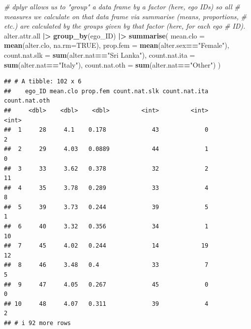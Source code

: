 \documentclass[
]{book}
\newenvironment{Shaded}{\begin{snugshade}}{\end{snugshade}}
\newcommand{\AttributeTok}[1]{\textcolor[rgb]{0.13,0.29,0.53}{#1}}
\newcommand{\CommentTok}[1]{\textcolor[rgb]{0.56,0.35,0.01}{\textit{#1}}}
\newcommand{\ConstantTok}[1]{\textcolor[rgb]{0.56,0.35,0.01}{#1}}
\newcommand{\FunctionTok}[1]{\textcolor[rgb]{0.13,0.29,0.53}{\textbf{#1}}}
\newcommand{\NormalTok}[1]{#1}
\newcommand{\SpecialCharTok}[1]{\textcolor[rgb]{0.81,0.36,0.00}{\textbf{#1}}}
\newcommand{\StringTok}[1]{\textcolor[rgb]{0.31,0.60,0.02}{#1}}
\begin{document}
\begin{Shaded}
\begin{Highlighting}[]
\CommentTok{\# dplyr allows us to "group" a data frame by a factor (here, ego IDs) so all}
\CommentTok{\# measures we calculate on that data frame via summarise (means, proportions,}
\CommentTok{\# etc.) are calculated by the groups given by that factor (here, for each ego}
\CommentTok{\# ID).}
\NormalTok{alter.attr.all }\SpecialCharTok{|\textgreater{}} 
  \FunctionTok{group\_by}\NormalTok{(ego\_ID) }\SpecialCharTok{|\textgreater{}} 
  \FunctionTok{summarise}\NormalTok{(}
    \AttributeTok{mean.clo =} \FunctionTok{mean}\NormalTok{(alter.clo, }\AttributeTok{na.rm=}\ConstantTok{TRUE}\NormalTok{), }
    \AttributeTok{prop.fem =} \FunctionTok{mean}\NormalTok{(alter.sex}\SpecialCharTok{==}\StringTok{"Female"}\NormalTok{), }
    \AttributeTok{count.nat.slk =} \FunctionTok{sum}\NormalTok{(alter.nat}\SpecialCharTok{==}\StringTok{"Sri Lanka"}\NormalTok{), }
    \AttributeTok{count.nat.ita =} \FunctionTok{sum}\NormalTok{(alter.nat}\SpecialCharTok{==}\StringTok{"Italy"}\NormalTok{), }
    \AttributeTok{count.nat.oth =} \FunctionTok{sum}\NormalTok{(alter.nat}\SpecialCharTok{==}\StringTok{"Other"}\NormalTok{)}
\NormalTok{  )}
\end{Highlighting}
\end{Shaded}

\begin{verbatim}
## # A tibble: 102 x 6
##    ego_ID mean.clo prop.fem count.nat.slk count.nat.ita count.nat.oth
##     <dbl>    <dbl>    <dbl>         <int>         <int>         <int>
##  1     28     4.1    0.178             43             0             2
##  2     29     4.03   0.0889            44             1             0
##  3     33     3.62   0.378             32             2            11
##  4     35     3.78   0.289             33             4             8
##  5     39     3.73   0.244             39             5             1
##  6     40     3.32   0.356             34             1            10
##  7     45     4.02   0.244             14            19            12
##  8     46     3.48   0.4               33             7             5
##  9     47     4.05   0.267             45             0             0
## 10     48     4.07   0.311             39             4             2
## # i 92 more rows
\end{verbatim}
\end{document}
